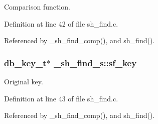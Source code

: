 Comparison function. 

Definition at line 42 of file sh\_\-find.c.

Referenced by \_\-sh\_\-find\_\-comp(), and sh\_\-find().\hypertarget{struct__sh__find__s_o1}{
\subsubsection[sf\_\-key]{\setlength{\rightskip}{0pt plus 5cm}\hyperlink{struct__db__key__s}{db\_\-key\_\-t}$\ast$ \hyperlink{struct__sh__find__s_o1}{\_\-sh\_\-find\_\-s::sf\_\-key}}}
\label{struct__sh__find__s_o1}


Original key. 

Definition at line 43 of file sh\_\-find.c.

Referenced by \_\-sh\_\-find\_\-comp(), and sh\_\-find().